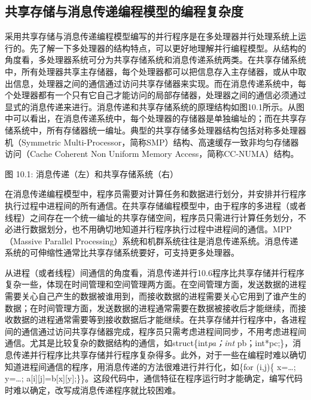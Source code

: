 \documentclass[]{ctexbook}
\begin{document}
\hypertarget{ux5171ux4eabux5b58ux50a8ux4e0eux6d88ux606fux4f20ux9012ux7f16ux7a0bux6a21ux578bux7684ux7f16ux7a0bux590dux6742ux5ea6}{%
\subsection{共享存储与消息传递编程模型的编程复杂度}\label{ux5171ux4eabux5b58ux50a8ux4e0eux6d88ux606fux4f20ux9012ux7f16ux7a0bux6a21ux578bux7684ux7f16ux7a0bux590dux6742ux5ea6}}

采用共享存储与消息传递编程模型编写的并行程序是在多处理器并行处理系统上运行的。先了解一下多处理器的结构特点，可以更好地理解并行编程模型。从结构的角度看，多处理器系统可分为共享存储系统和消息传递系统两类。在共享存储系统中，所有处理器共享主存储器，每个处理器都可以把信息存入主存储器，或从中取出信息，处理器之间的通信通过访问共享存储器来实现。而在消息传递系统中，每个处理器都有一个只有它自己才能访问的局部存储器，处理器之间的通信必须通过显式的消息传递来进行。消息传递和共享存储系统的原理结构如图10.1所示。从图中可以看出，在消息传递系统中，每个处理器的存储器是单独编址的；而在共享存储系统中，所有存储器统一编址。典型的共享存储多处理器结构包括对称多处理器机（Symmetric Multi-Processor，简称SMP）结构、高速缓存一致非均匀存储器访问（Cache Coherent Non Uniform Memory Access，简称CC-NUMA）结构。

图 10.1: 消息传递（左）和共享存储系统（右）

在消息传递编程模型中，程序员需要对计算任务和数据进行划分，并安排并行程序执行过程中进程间的所有通信。在共享存储编程模型中，由于程序的多进程（或者线程）之间存在一个统一编址的共享存储空间，程序员只需进行计算任务划分，不必进行数据划分，也不用确切地知道并行程序执行过程中进程间的通信。MPP（Massive Parallel Processing）系统和机群系统往往是消息传递系统。消息传递系统的可伸缩性通常比共享存储系统要好，可支持更多处理器。

从进程（或者线程）间通信的角度看，消息传递并行10.6程序比共享存储并行程序复杂一些，体现在时间管理和空间管理两方面。在空间管理方面，发送数据的进程需要关心自己产生的数据被谁用到，而接收数据的进程需要关心它用到了谁产生的数据；在时间管理方面，发送数据的进程通常需要在数据被接收后才能继续，而接收数据的进程通常需要等到接收数据后才能继续。在共享存储并行程序中，各进程间的通信通过访问共享存储器完成，程序员只需考虑进程间同步，不用考虑进程间通信。尤其是比较复杂的数据结构的通信，如struct\{int\emph{pa；int} pb；int*pc;\}，消息传递并行程序比共享存储并行程序复杂得多。此外，对于一些在编程时难以确切知道进程间通信的程序，用消息传递的方法很难进行并行化，如\{for (i,j)\{ x=\ldots; y=\ldots; a{[}i{]}{[}j{]}=b{[}x{]}{[}y{]};\}\}。这段代码中，通信特征在程序运行时才能确定，编写代码时难以确定，改写成消息传递程序就比较困难。
\end{document}
